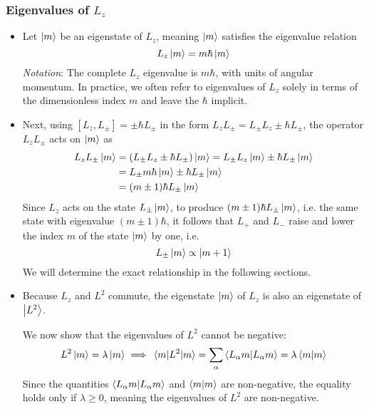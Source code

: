 \documentclass[11pt, a4paper]{article}
\begin{document}
\subsubsection{Eigenvalues of $ L_{z} $}
\begin{itemize}
	
	\item Let $ \ket{m} $ be an eigenstate of $ L_{z} $, meaning $ \ket{m} $ satisfies the eigenvalue relation
	\begin{equation*}
		L_{z}\ket{m} = m \hbar \ket{m}
	\end{equation*}
	\textit{Notation}: The complete $ L_{z} $ eigenvalue is $ m\hbar $, with units of angular momentum. In practice, we often refer to eigenvalues of $ L_{z} $ solely in terms of the dimensionless index $ m $ and leave the $ \hbar $ implicit.
	
	\item Next, using $ [L_{z}, L_{\pm}] = \pm \hbar L_{\pm} $ in the form $ L_{z}L_{\pm} = L_{\pm}L_{z} \pm \hbar L_{\pm} $, the operator $ L_{z}L_{\pm} $ acts on $ \ket{m} $ as
	\begin{align*}
		L_{z}L_{\pm} \ket{m} &= (L_{\pm}L_{z} \pm \hbar L_{\pm})\ket{m} = L_{\pm} L_{z}\ket{m} \pm \hbar L_{\pm}\ket{m}\\
        & = L_{\pm} m \hbar \ket{m} \pm \hbar L_{\pm}\ket{m}\\
		& = (m \pm 1)\hbar L_{\pm}\ket{m}
	\end{align*}
	Since $ L_{z} $ acts on the state $ L_{\pm}\ket{m} $,  to produce $ (m \pm 1)\hbar L_{\pm}\ket{m} $, i.e. the same state with eigenvalue $ (m \pm 1)\hbar $, it follows that $ L_{+} $ and $ L_{-} $ raise and lower the index $ m $ of the state $ \ket{m} $ by one, i.e. 
	\begin{equation*}
		L_{\pm} \ket{m} \propto \ket{m+1}
	\end{equation*}
	We will determine the exact relationship in the following sections.
	
	\item Because $ L_{z} $ and $ L^{2} $ commute, the eigenstate $ \ket{m} $ of $ L_{z} $ is also an eigenstate of $ \ket{L^{2}} $. 
	
	We now show that the eigenvalues of $ L^{2} $ cannot be negative:
	\begin{equation*}
		L^{2}\ket{m} = \lambda \ket{m} \implies \mel{m}{L^{2}}{m} = \sum_{\alpha} \braket{L_{\alpha}m}{L_{\alpha}m} = \lambda \braket{m}{m}
	\end{equation*}
	Since the quantities $ \braket{L_{\alpha}m}{L_{\alpha}m} $ and $ \braket{m}{m} $ are non-negative, the equality holds only if $ \lambda \geq 0 $, meaning the eigenvalues of $ L^{2} $ are non-negative.
	

\end{itemize}
\end{document}
